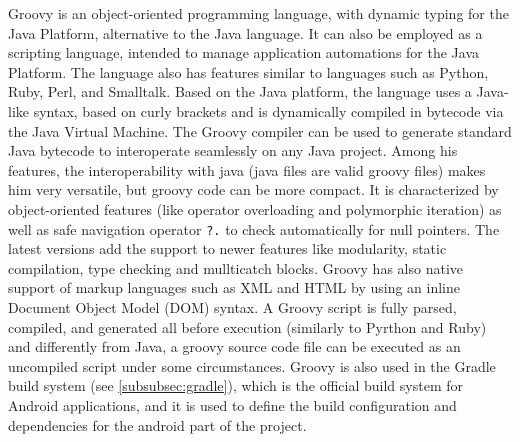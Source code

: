 Groovy is an object-oriented programming language, with dynamic typing for the Java Platform, alternative to the Java language. It can also be employed as a scripting language, intended to manage application automations for the Java Platform. The language also has features similar to languages such as Python, Ruby, Perl, and Smalltalk. Based on the Java platform, the language uses a Java-like syntax, based on curly brackets and is dynamically compiled in bytecode via the Java Virtual Machine. The Groovy compiler can be used to generate standard Java bytecode to interoperate seamlessly on any Java project. Among his features, the interoperability with java (java files are valid groovy files) makes him very versatile, but groovy code can be more compact. It is characterized by object-oriented features (like operator overloading and polymorphic iteration) as well as safe navigation operator \texttt{?.} to check automatically for null pointers. The latest versions add the support to newer features like modularity, static compilation, type checking and mullticatch blocks. Groovy has also native support of markup languages such as XML and HTML by using an inline Document Object Model (DOM) syntax. A Groovy script is fully parsed, compiled, and generated all before execution (similarly to Pyrthon and Ruby) and differently from Java, a groovy source code file can be executed as an uncompiled script under some circumstances\cite{Groovy}. Groovy is also used in the Gradle build system (see \cref{subsubsec:gradle}), which is the official build system for Android applications, and it is used to define the build configuration and dependencies for the android part of the project.  



